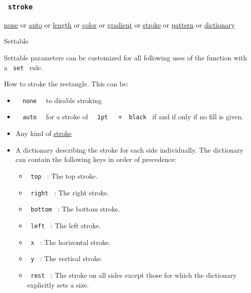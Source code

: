 \subsubsection{\texorpdfstring{\texttt{\ stroke\ }}{ stroke }}\label{parameters-stroke}

\href{/docs/reference/foundations/none/}{none} {or}
\href{/docs/reference/foundations/auto/}{auto} {or}
\href{/docs/reference/layout/length/}{length} {or}
\href{/docs/reference/visualize/color/}{color} {or}
\href{/docs/reference/visualize/gradient/}{gradient} {or}
\href{/docs/reference/visualize/stroke/}{stroke} {or}
\href{/docs/reference/visualize/pattern/}{pattern} {or}
\href{/docs/reference/foundations/dictionary/}{dictionary}

{{ Settable }}

\label{parameters-stroke-settable-tooltip}
Settable parameters can be customized for all following uses of the
function with a \texttt{\ set\ } rule.

How to stroke the rectangle. This can be:

\begin{itemize}
\tightlist
\item
  \texttt{\ }{\texttt{\ none\ }}\texttt{\ } to disable stroking
\item
  \texttt{\ }{\texttt{\ auto\ }}\texttt{\ } for a stroke of
  \texttt{\ }{\texttt{\ 1pt\ }}\texttt{\ }{\texttt{\ +\ }}\texttt{\ black\ }
  if and if only if no fill is given.
\item
  Any kind of \href{/docs/reference/visualize/stroke/}{stroke}
\item
  A dictionary describing the stroke for each side individually. The
  dictionary can contain the following keys in order of precedence:

  \begin{itemize}
  \tightlist
  \item
    \texttt{\ top\ } : The top stroke.
  \item
    \texttt{\ right\ } : The right stroke.
  \item
    \texttt{\ bottom\ } : The bottom stroke.
  \item
    \texttt{\ left\ } : The left stroke.
  \item
    \texttt{\ x\ } : The horizontal stroke.
  \item
    \texttt{\ y\ } : The vertical stroke.
  \item
    \texttt{\ rest\ } : The stroke on all sides except those for which
    the dictionary explicitly sets a size.
  \end{itemize}
\end{itemize}

